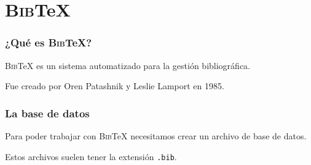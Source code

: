 \documentclass[12pt,aspectratio=169,ignorenonframetext]{ltxbeamer}
\newcommand{\BibTeX}{\textsc{Bib}\TeX}
\begin{document}
\section{{\lmr\BibTeX}}

\begin{frame}
\centering
\vfill
\resizebox{0.95\linewidth}{!}{\lmr\BibTeX}
\vfill
\end{frame}






\begin{frame}
\frametitle{¿Qué es {\lmr\BibTeX}?}

{\lmr\BibTeX} es un sistema automatizado para la gestión bibliográfica.

\pause

Fue creado por Oren Patashnik y Leslie Lamport en 1985.
\end{frame}





\begin{frame}
\frametitle{La base de datos}

Para poder trabajar con {\lmr\BibTeX} necesitamos crear un archivo de base de datos.

\pause

Estos archivos suelen tener la extensión \texttt{.bib}.
\end{frame}
\end{document}
